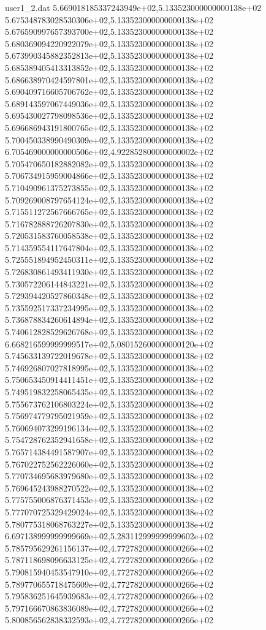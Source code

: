 \begin{filecontents}{user1_2.dat}
5.669018185337243949e+02,5.133523000000000138e+02
5.675348783028530306e+02,5.133523000000000138e+02
5.676590997657393700e+02,5.133523000000000138e+02
5.680369094220922079e+02,5.133523000000000138e+02
5.673990345882352813e+02,5.133523000000000138e+02
5.685389405413313852e+02,5.133523000000000138e+02
5.686638970424597801e+02,5.133523000000000138e+02
5.690409716605706762e+02,5.133523000000000138e+02
5.689143597067449036e+02,5.133523000000000138e+02
5.695430027798098536e+02,5.133523000000000138e+02
5.696686943191800765e+02,5.133523000000000138e+02
5.700450338990490309e+02,5.133523000000000138e+02
6.705469000000000506e+02,4.922852800000000002e+02
5.705470650182882082e+02,5.133523000000000138e+02
5.706734915959004866e+02,5.133523000000000138e+02
5.710490961375273855e+02,5.133523000000000138e+02
5.709269008797654124e+02,5.133523000000000138e+02
5.715511272567666765e+02,5.133523000000000138e+02
5.716782888726207830e+02,5.133523000000000138e+02
5.720531583760058538e+02,5.133523000000000138e+02
5.714359554117647804e+02,5.133523000000000138e+02
5.725551894952450311e+02,5.133523000000000138e+02
5.726830861493411930e+02,5.133523000000000138e+02
5.730572206144843221e+02,5.133523000000000138e+02
5.729394420527860348e+02,5.133523000000000138e+02
5.735592517337234995e+02,5.133523000000000138e+02
5.736878834260614894e+02,5.133523000000000138e+02
5.740612828529626768e+02,5.133523000000000138e+02
6.668216599999999517e+02,5.080152600000000120e+02
5.745633139722019678e+02,5.133523000000000138e+02
5.746926807027818995e+02,5.133523000000000138e+02
5.750653450914411451e+02,5.133523000000000138e+02
5.749519832258065435e+02,5.133523000000000138e+02
5.755673762106803224e+02,5.133523000000000138e+02
5.756974779795021959e+02,5.133523000000000138e+02
5.760694073299196134e+02,5.133523000000000138e+02
5.754728762352941658e+02,5.133523000000000138e+02
5.765714384491587907e+02,5.133523000000000138e+02
5.767022752562226060e+02,5.133523000000000138e+02
5.770734695683979680e+02,5.133523000000000138e+02
5.769645243988270522e+02,5.133523000000000138e+02
5.775755006876371453e+02,5.133523000000000138e+02
5.777070725329429024e+02,5.133523000000000138e+02
5.780775318068763227e+02,5.133523000000000138e+02
6.697138999999999669e+02,5.283112999999999602e+02
5.785795629261156137e+02,4.772782000000000266e+02
5.787118698096633125e+02,4.772782000000000266e+02
5.790815940453547910e+02,4.772782000000000266e+02
5.789770655718475609e+02,4.772782000000000266e+02
5.795836251645939683e+02,4.772782000000000266e+02
5.797166670863836089e+02,4.772782000000000266e+02
5.800856562838332593e+02,4.772782000000000266e+02

\end{filecontents}
